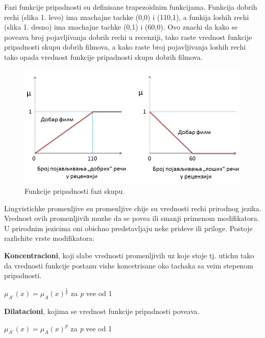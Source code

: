 \documentclass[cyr]{bibl}
\begin{document}
\begin{justify}
Fazi funkcije pripadnosti su definisane trapezoidnim funkcijama. Funkcija dobrih rechi (slika 1. levo) ima znachajne tachke (0,0) i (110,1), a funkija loshih rechi (slika 1. desno) ima znachajne tachke (0,1) i (60,0). Ovo znachi da kako se pove\cc ava broj pojavljivanja dobrih rechi u recenziji, tako raste vrednost funkcije pripadnosti skupu dobrih filmova, a kako raste broj pojavljivanja loshih rechi tako opada vrednost funkcije pripadnosti skupu dobrih filmova. 

\begin{figure}[ht!]
\centering
\includegraphics[width=1.0\textwidth]{fazi2.png}
\caption{Funkcije pripadnosti fazi skupu.}\label{sample image}
\end{figure}


Lingvistichke promenljive su promenljive chije su vrednosti rechi prirodnog jezika. Vrednost ovih promenljivih mozhe da se pove\cc a ili smanji primenom modifikatora. U prirodnim jezicima oni obichno predstavljaju neke prideve ili priloge. Postoje razlichite vrste modifikatora:
\begin{itemize}
    \begin{justify}
    \item \textbf{Koncentracioni}, koji slabe vrednosti promenljivih uz koje stoje tj. utichu tako da vrednosti funkcije postanu vishe koncetrisane oko tachaka sa ve\cc im stepenom pripadnosti.
    
    \centering\(\mu_{A'}(x) = \mu_{A}(x)^{\frac{1}{p}}\)  za \textit{\Lat p} ve\cc e od 1
    \end{justify}
    \begin{justify}
	\item \textbf{Dilatacioni}, kojima se vrednost funkcije pripadnosti pove\cc ava.
	
    \centering\(\mu_{A'}(x) = \mu_{A}(x)^{p}\)  za \textit{\Lat p} ve\cc e od 1
    

\end{justify}
\end{itemize}
\end{justify}
\end{document}
